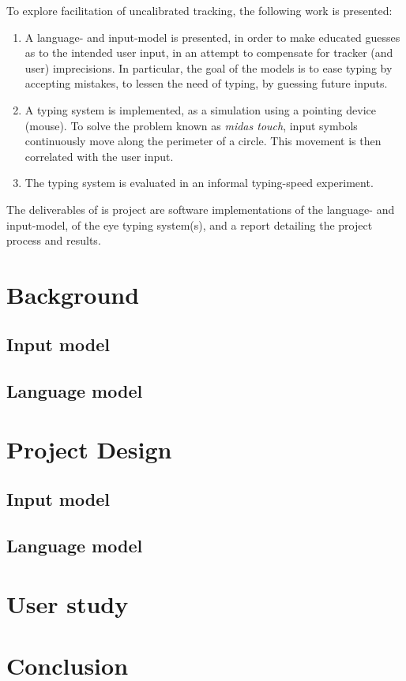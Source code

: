 \documentclass[a4paper, titlepage]{article}
\renewcommand{\%}{\scalebox{.9}{\oldpct}}
\begin{document}
To explore facilitation of uncalibrated tracking, the following work is
presented:
\begin{enumerate}
\item
  A language- and input-model is presented, in order
  to make educated guesses as to the intended user input, in an attempt
  to compensate for tracker (and user) imprecisions. In particular, the goal of
  the models is to ease typing by accepting mistakes, to lessen the need of
  typing, by guessing future inputs.
\item
  A typing system is implemented, as a simulation using a
  pointing device (mouse). To solve the problem known as
  \emph{midas touch}, input symbols continuously move along the perimeter of a
  circle. This movement is then correlated with the user input.
\item
  The typing system is evaluated in an informal typing-speed experiment.
\end{enumerate}

The deliverables of is project are software implementations of the
language- and input-model, of the eye typing system(s), and a report
detailing the project process and results.

\section{Background}
\subsection{Input model}
\subsection{Language model}

\section{Project Design}
\subsection{Input model}
\subsection{Language model}

\section{User study}
\section{Conclusion}
\end{document}
